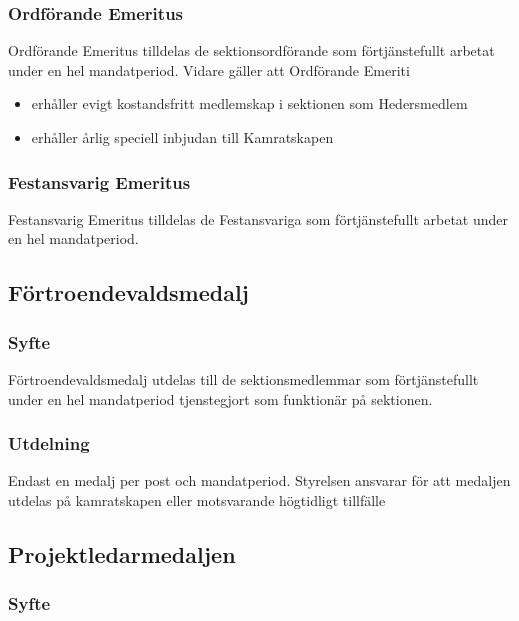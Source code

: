 \documentclass{../resources/dgovdoc}
\begin{document}
\subsubsection{Ordförande Emeritus}

Ordförande Emeritus tilldelas de sektionsordförande som förtjänstefullt arbetat under en hel mandatperiod. 
    Vidare gäller att Ordförande Emeriti
\begin{itemize}
\item erhåller evigt kostandsfritt medlemskap i sektionen som Hedersmedlem
\item erhåller årlig speciell inbjudan till Kamratskapen
\end{itemize}

\subsubsection{Festansvarig Emeritus}

Festansvarig Emeritus tilldelas de Festansvariga som förtjänstefullt arbetat under en hel mandatperiod.

\subsection{Förtroendevaldsmedalj}

\subsubsection{Syfte}

Förtroendevaldsmedalj utdelas till de sektionsmedlemmar som förtjänstefullt under en hel mandatperiod tjenstegjort som funktionär på sektionen. 

\subsubsection{Utdelning}

Endast en medalj per post och mandatperiod. Styrelsen ansvarar för att medaljen utdelas på kamratskapen eller motsvarande högtidligt tillfälle

\subsection{Projektledarmedaljen}

\subsubsection{Syfte}
\end{document}
